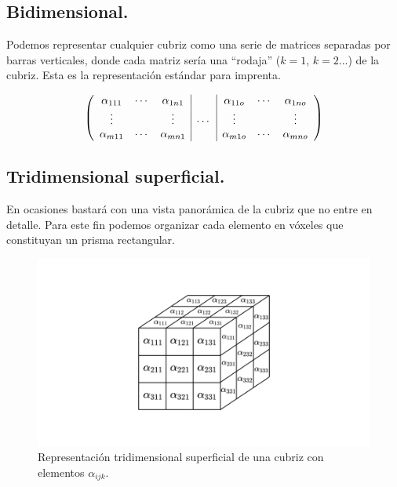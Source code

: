 \documentclass[a4paper, titlepage]{article}
\begin{document}
\subsection{Bidimensional.}

Podemos representar cualquier cubriz como una serie de matrices separadas por barras verticales, donde cada matriz sería una ``rodaja'' ($k=1$, $k=2$...) de la cubriz. Esta es la representación estándar para imprenta.

\[ \left(
\begin{array}{c c c | c | c c c}
	\alpha_{111} & \cdots & \alpha_{1n1} &        & \alpha_{11o} & \cdots & \alpha_{1no} \\
	\vdots       &        & \vdots       & \cdots & \vdots       &        & \vdots       \\
	\alpha_{m11} & \cdots & \alpha_{mn1} &        & \alpha_{m1o} & \cdots & \alpha_{mno} \\
\end{array} \right)
\]

\subsection{Tridimensional superficial.}

En ocasiones bastará con una vista panorámica de la cubriz que no entre en detalle. Para este fin podemos organizar cada elemento en vóxeles que constituyan un prisma rectangular.

\begin{figure}[H]
	\includegraphics[width=\linewidth]{tridimensional_sup.png}
	\caption{Representación tridimensional superficial de una cubriz con elementos $\alpha_{ijk}$.}
\end{figure}

\newpage
\end{document}
